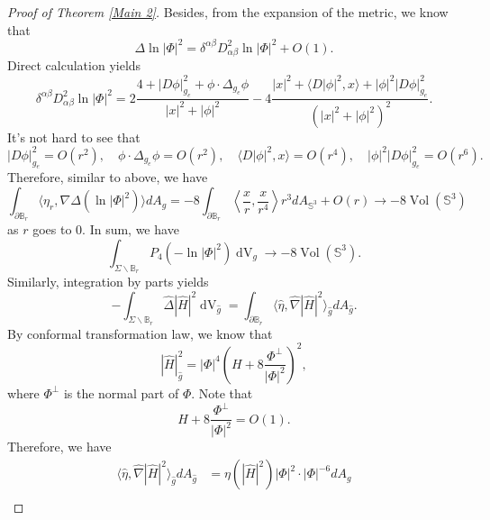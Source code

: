 \documentclass[11pt,letterpaper]{amsart}
\DeclareMathOperator{\Vol}{Vol}
\DeclareMathOperator{\dvol}{dV}
\theoremstyle{definition}
\theoremstyle{remark}
\numberwithin{equation}{section}
\begin{document}
\begin{proof}[Proof of Theorem \ref{Main 2}]
Besides, from the expansion of the metric, we know that 
\begin{equation*}
    \Delta \ln |\Phi|^2=\delta^{\alpha\beta}D^2_{\alpha\beta}\ln |\Phi|^2+O(1).
\end{equation*}
Direct calculation yields
\begin{equation*}
    \delta^{\alpha\beta}D^2_{\alpha\beta}\ln |\Phi|^2=2\frac{4+|D\phi|^2_{g_e}+\phi\cdot \Delta_{g_e}\phi}{|x|^2+|\phi|^2}-4\frac{|x|^2+\langle D|\phi|^2, x\rangle+|\phi|^2|D\phi|_{g_e}^2}{\left(|x|^2+|\phi|^2\right)^2}.
\end{equation*}
It's not hard to see that
\begin{equation*}
    |D\phi|^2_{g_e}=O(r^2), \quad \phi\cdot \Delta_{g_e}\phi=O(r^2), \quad \langle D|\phi|^2, x\rangle=O(r^4), \quad |\phi|^2|D\phi|_{g_e}^2=O(r^6).
\end{equation*}
Therefore, similar to above, we have
\begin{equation*}
    \int_{\partial \mathbb{B}_r}\langle \eta_r, \nabla \Delta \left(\ln |\Phi|^2\right)\rangle dA_g= -8\int_{\partial \mathbb{B}_r}\left\langle \frac{x}{r}, \frac{x}{r^4}\right\rangle r^3dA_{\mathbb{S}^3}+O(r)\to -8\Vol(\mathbb{S}^3)
\end{equation*}
as $r$ goes to $0$.
In sum, we have
\begin{equation*}
    \int_{\Sigma \backslash \mathbb{B}_r}P_4 \left(-\ln |\Phi|^2\right)\dvol_g\to -8\Vol(\mathbb{S}^3).
\end{equation*}
Similarly, integration by parts yields
\begin{equation*}
    -\int_{\Sigma \backslash \mathbb{B}_r}\hat{\Delta}|\hat{H}|^2\dvol_{\hat{g}}=\int_{\partial \mathbb{B}_r} \langle \hat{\eta}, \hat{\nabla} |\hat{H}|^2\rangle_{\hat{g}}dA_{\hat{g}}.
\end{equation*}
By conformal transformation law, we know that
\begin{equation*}
    |\hat{H}|^2_{\hat{g}}=|\Phi|^4\left(H+8\frac{\Phi^{\perp}}{|\Phi|^2}\right)^2,
\end{equation*}
where $\Phi^{\perp}$ is the normal part of $\Phi$.
Note that 
\begin{equation*}
    H+8\frac{\Phi^{\perp}}{|\Phi|^2}=O(1).
\end{equation*}
Therefore, we have
\begin{equation*}
\begin{split}
    \langle \hat{\eta}, \hat{\nabla} |\hat{H}|^2\rangle_{\hat{g}}dA_{\hat{g}}&=\eta(|\hat{H}|^2)|\Phi|^2\cdot |\Phi|^{-6}dA_{g}\\

\end{split}
\end{equation*}
\end{proof}
\end{document}
